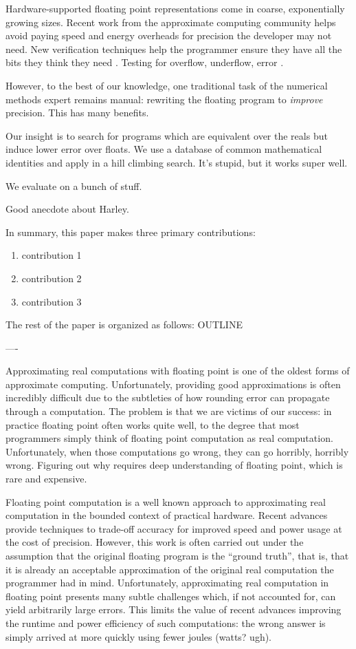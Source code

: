 \documentclass[paper.tex]{subfiles}
\begin{document}
Hardware-supported floating point representations come in coarse,
exponentially growing sizes.  Recent work from the approximate
computing community helps avoid paying speed and energy overheads for
precision the developer may not need.   New
verification techniques help the programmer ensure they have all the
bits they think they need .  Testing for overflow,
underflow, error .

However, to the best of our knowledge, one traditional task of the
numerical methods expert remains manual: rewriting the floating
program to \textit{improve} precision.  This has many benefits.

Our insight is to search for programs which are equivalent over the
reals but induce lower error over floats.  We use a database of common
mathematical identities and apply in a hill climbing search.  It's
stupid, but it works super well.

We evaluate on a bunch of stuff.

Good anecdote about Harley.

In summary, this paper makes three primary contributions:
\begin{enumerate}
\item contribution 1
\item contribution 2
\item contribution 3
\end{enumerate}

The rest of the paper is organized as follows: OUTLINE

----

Approximating real computations with floating point is one of the oldest
forms of approximate computing.  Unfortunately, providing good
approximations is often incredibly difficult due to the subtleties of how
rounding error can propagate through a computation.  The problem is that we
are victims of our success: in practice floating point often works quite
well, to the degree that most programmers simply think of floating point
computation as real computation.  Unfortunately, when those computations go
wrong, they can go horribly, horribly wrong.  Figuring out why requires
deep understanding of floating point, which is rare and expensive.

Floating point computation is a well known approach to approximating real
computation in the bounded context of practical hardware.  Recent advances
provide techniques to trade-off accuracy for improved speed and power usage
at the cost of precision.  However, this work is often carried out under
the assumption that the original floating program is the ``ground truth'',
that is, that it is already an acceptable approximation of the original
real computation the programmer had in mind.  Unfortunately, approximating
real computation in floating point presents many subtle challenges which,
if not accounted for, can yield arbitrarily large errors.  This limits the
value of recent advances improving the runtime and power efficiency of such
computations: the wrong answer is simply arrived at more quickly using
fewer joules (watts? ugh).
\end{document}
